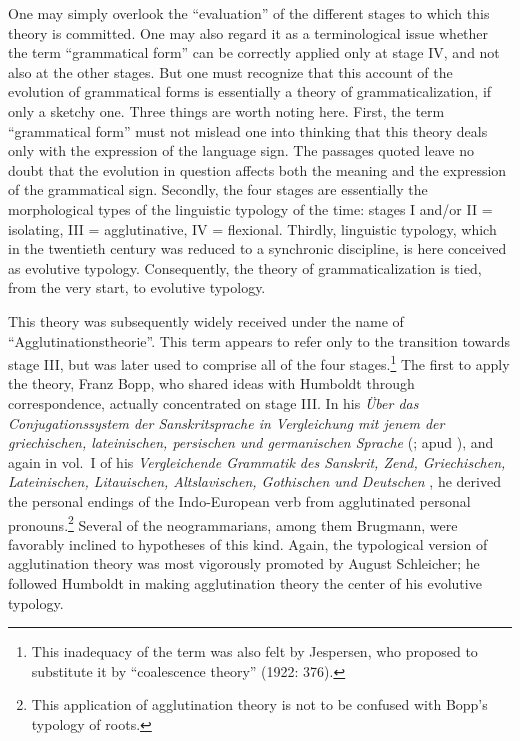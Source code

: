 One may simply overlook the “evaluation” of the different stages to which this theory is committed. One may also regard it as a terminological issue whether the term ``grammatical form'' can be correctly applied only at stage IV, and not also at the other stages. But one must recognize that this account of the evolution of grammatical forms is essentially a theory of grammaticalization, if only a sketchy one. Three things are worth noting here. First, the term ``grammatical form'' must not mislead one into thinking that this theory deals only with the  expression of the language sign. The passages quoted leave no doubt that the evolution in question affects both the meaning and the expression of the grammatical sign. Secondly, the four stages are essentially the morphological types of the linguistic typology of the time: stages I and/or II = isolating, III = agglutinative, IV = flexional. Thirdly, linguistic typology, which in the twentieth century was reduced to a synchronic discipline, is here conceived as evolutive typology. Consequently, the theory of grammaticalization is tied, from the very start, to evolutive typology.

This theory was subsequently widely received under the name of “Agglutinationstheorie”.\label{Agglutinationstheorie} This term appears to refer only to the transition towards stage III, but was later used to comprise all of the four stages.\footnote{This inadequacy of the term was also felt by Jespersen, who proposed to substitute it by “coalescence theory” (1922: 376).} The first to apply the theory, Franz Bopp\label{Bopp}, who shared ideas with Humboldt through correspondence, actually concentrated on stage III. In his \textit{Über das Conjugationssystem der Sanskritsprache in Vergleichung mit jenem der griechischen, lateinischen, persischen und germanischen Sprache} (\citeyear[147f]{Bopp1816}; apud \citealt[177]{Arens1969}), and again in vol.~I of his \textit{Vergleichende Grammatik des Sanskrit, Zend, Griechischen, Lateinischen, Litauischen, Altslavischen, Gothischen und Deutschen} \citep{Bopp1833}, he derived the personal endings of the Indo-European verb from agglutinated personal pronouns.\footnote{This application of agglutination theory is not to be confused with Bopp's typology of roots.} Several of the neogrammarians, among them Brugmann, were favorably inclined to hypotheses of this kind. Again, the typological version of agglutination theory was most vigorously promoted by August Schleicher; he followed Humboldt in making agglutination theory the center of his evolutive typology.

